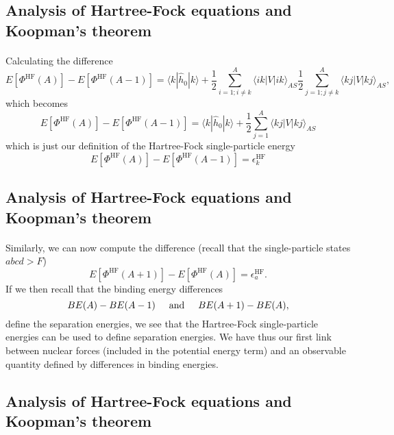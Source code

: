 \documentclass[%
twoside,                 %
final,                   %
10pt]{article}
\begin{document}
\subsection*{Analysis of Hartree-Fock equations and Koopman's theorem}

\paragraph{}
Calculating the difference 
\[
  E[\Phi^{\mathrm{HF}}(A)]-   E[\Phi^{\mathrm{HF}}(A-1)] 
  = \langle k | \hat{h}_0 | k \rangle +
  \frac{1}{2}\sum_{i=1;i\ne k}^A\langle ik|V|ik\rangle_{AS}  \frac{1}{2}\sum_{j=1;j\ne k}^A\langle kj|V|kj\rangle_{AS},
\]
which becomes 
\[
  E[\Phi^{\mathrm{HF}}(A)]-   E[\Phi^{\mathrm{HF}}(A-1)] 
  = \langle k | \hat{h}_0 | k \rangle +
  \frac{1}{2}\sum_{j=1}^A\langle kj|V|kj\rangle_{AS}
\]
which is just our definition of the Hartree-Fock single-particle energy
\[
  E[\Phi^{\mathrm{HF}}(A)]-   E[\Phi^{\mathrm{HF}}(A-1)] 
  = \epsilon_k^{\mathrm{HF}} 
\]



\subsection*{Analysis of Hartree-Fock equations and Koopman's theorem}

\paragraph{}
Similarly, we can now compute the difference (recall that the single-particle states $abcd > F$)
\[
  E[\Phi^{\mathrm{HF}}(A+1)]-   E[\Phi^{\mathrm{HF}}(A)]= \epsilon_a^{\mathrm{HF}}. 
\]
If we then recall that the binding energy differences 
\[
BE(A)-BE(A-1) \hspace{0.5cm} \mathrm{and} \hspace{0.5cm} BE(A+1)-BE(A), 
\]
define the separation energies, we see that the Hartree-Fock single-particle energies can be used to
define separation energies. We have thus our first link between nuclear forces (included in the potential energy term) and an observable quantity defined by differences in binding energies.



\subsection*{Analysis of Hartree-Fock equations and Koopman's theorem}
\end{document}
